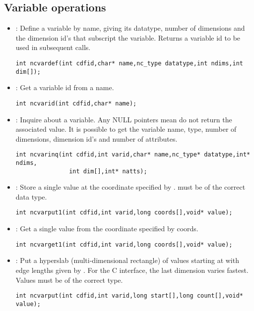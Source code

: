 \documentclass{article}
\begin{document}
\subsection{Variable operations}

\begin{itemize}

\item {} : Define a variable by name, giving its datatype, number
of dimensions 
and the dimension id's that subscript the variable. Returns a variable
id to be used in subsequent calls.
\begin{verbatim}
int ncvardef(int cdfid,char* name,nc_type datatype,int ndims,int dim[]);
\end{verbatim}

\item {} : Get a variable id from a name. 
\begin{verbatim}
int ncvarid(int cdfid,char* name);
\end{verbatim}

\item {} : Inquire about a variable. Any NULL pointers mean do
not return the 
associated value. It is possible to get the variable name, type,
number of dimensions, dimension id's and number of attributes.
\begin{verbatim}
int ncvarinq(int cdfid,int varid,char* name,nc_type* datatype,int* ndims,
               int dim[],int* natts);
\end{verbatim}

\item {} : Store a single value at the coordinate specified by
. 
 must be of the correct data type.
\begin{verbatim}
int ncvarput1(int cdfid,int varid,long coords[],void* value);
\end{verbatim}

\item {} : Get a single value from the coordinate specified by
coords. 
\begin{verbatim}
int ncvarget1(int cdfid,int varid,long coords[],void* value);
\end{verbatim}

\item {} : Put a hyperslab (multi-dimensional rectangle) of
values starting at 
 with edge lengths given by . For the C
interface, the last dimension varies fastest. Values must be of the
correct type.
\begin{verbatim}
int ncvarput(int cdfid,int varid,long start[],long count[],void* value);
\end{verbatim}


\end{itemize}
\end{document}
